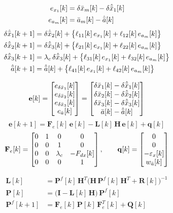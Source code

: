 \[
\begin{aligned}
e_{x_1}[k] &= \delta\bar{x}_m[k] - \delta\hat{\bar{x}}_1[k] \\
e_{a_m}[k] &= \bar{a}_m[k] - \hat{\bar{a}}[k]
\end{aligned}
\]
\[
\begin{aligned}
\delta\hat{\bar{x}}_1[k+1] &= \delta\hat{\bar{x}}_2[k] + \big\{\ell_{11}[k]\,e_{x_1}[k] + \ell_{12}[k]\,e_{a_m}[k]\big\} \\
\delta\hat{\bar{x}}_2[k+1] &= \delta\hat{\bar{x}}_3[k] + \big\{\ell_{21}[k]\,e_{x_1}[k] + \ell_{22}[k]\,e_{a_m}[k]\big\} \\
\delta\hat{\bar{x}}_3[k+1] &= \lambda_c\,\delta\hat{\bar{x}}_3[k] + \big\{\ell_{31}[k]\,e_{x_1}[k] + \ell_{32}[k]\,e_{a_m}[k]\big\} \\
\hat{\bar{a}}[k+1] &= \hat{\bar{a}}[k] + \big\{\ell_{41}[k]\,e_{x_1}[k] + \ell_{42}[k]\,e_{a_m}[k]\big\}
\end{aligned}
\]

\[
\mathbf{e}[k] = \begin{bmatrix} e_{\delta\bar{x}_1}[k] \\ e_{\delta\bar{x}_2}[k] \\ e_{\delta\bar{x}_3}[k] \\ e_{\bar{a}}[k] \end{bmatrix}
= \begin{bmatrix} \delta\bar{x}_1[k] - \delta\hat{\bar{x}}_1[k] \\ \delta\bar{x}_2[k] - \delta\hat{\bar{x}}_2[k] \\ \delta\bar{x}_3[k] - \delta\hat{\bar{x}}_3[k] \\ \bar{a}[k] - \hat{\bar{a}}[k] \end{bmatrix}
\]
\[
\mathbf{e}[k+1] = \mathbf{F}_e[k]\,\mathbf{e}[k] - \mathbf{L}[k]\,\mathbf{H}\,\mathbf{e}[k] + \mathbf{q}[k]
\]
\[
\mathbf{F}_e[k] =
\begin{bmatrix}
0 & 1 & 0 & 0 \\
0 & 0 & 1 & 0 \\
0 & 0 & \lambda_c & -F_{dx}[k] \\
0 & 0 & 0 & 1
\end{bmatrix},
\qquad
\mathbf{q}[k] = \begin{bmatrix} 0 \\ 0 \\ -\varepsilon_x[k] \\ w_{\bar{a}}[k] \end{bmatrix}
\]

\[
\begin{aligned}
\mathbf{L}[k] &= \mathbf{P}^f[k]\,\mathbf{H}^T\big(\mathbf{H}\,\mathbf{P}^f[k]\,\mathbf{H}^T + \mathbf{R}[k]\big)^{-1} \\
\mathbf{P}[k] &= \big(\mathbf{I} - \mathbf{L}[k]\,\mathbf{H}\big)\,\mathbf{P}^f[k] \\
\mathbf{P}^f[k+1] &= \mathbf{F}_e[k]\,\mathbf{P}[k]\,\mathbf{F}_e^T[k] + \mathbf{Q}[k]
\end{aligned}
\]

